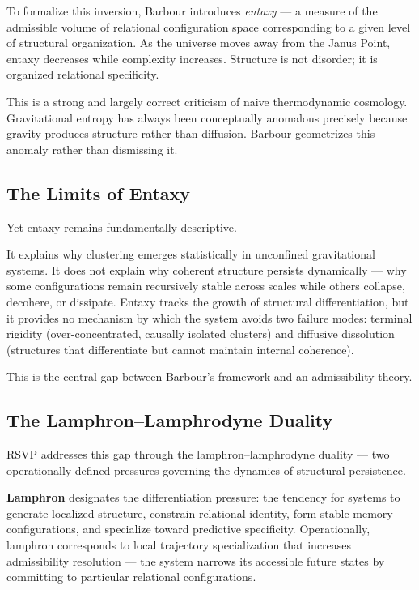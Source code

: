 \documentclass[12pt, a4paper]{article}
\begin{document}
To formalize this inversion, Barbour introduces \emph{entaxy} — a measure
of the admissible volume of relational configuration space corresponding to
a given level of structural organization. As the universe moves away from
the Janus Point, entaxy decreases while complexity increases. Structure is
not disorder; it is organized relational specificity.

This is a strong and largely correct criticism of naive thermodynamic
cosmology. Gravitational entropy has always been conceptually anomalous
precisely because gravity produces structure rather than diffusion. Barbour
geometrizes this anomaly rather than dismissing it.

\subsection{The Limits of Entaxy}

Yet entaxy remains fundamentally descriptive.

It explains why clustering emerges statistically in unconfined gravitational
systems. It does not explain why coherent structure persists dynamically —
why some configurations remain recursively stable across scales while others
collapse, decohere, or dissipate. Entaxy tracks the growth of structural
differentiation, but it provides no mechanism by which the system avoids
two failure modes: terminal rigidity (over-concentrated, causally isolated
clusters) and diffusive dissolution (structures that differentiate but
cannot maintain internal coherence).

This is the central gap between Barbour's framework and an admissibility
theory.

\subsection{The Lamphron–Lamphrodyne Duality}

RSVP addresses this gap through the lamphron–lamphrodyne duality — two
operationally defined pressures governing the dynamics of structural
persistence.

\textbf{Lamphron} designates the differentiation pressure: the tendency for
systems to generate localized structure, constrain relational identity, form
stable memory configurations, and specialize toward predictive specificity.
Operationally, lamphron corresponds to local trajectory specialization that
increases admissibility resolution — the system narrows its accessible future
states by committing to particular relational configurations.
\end{document}
